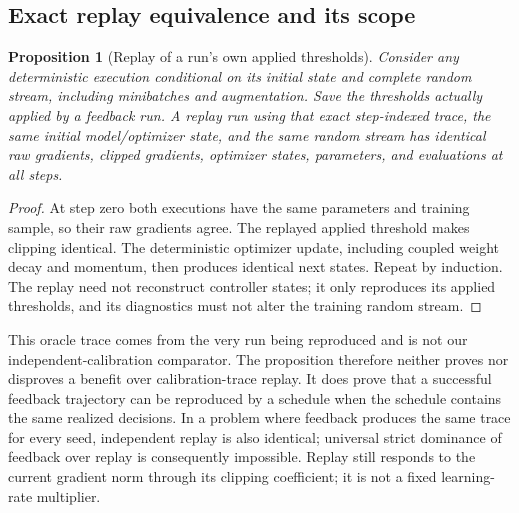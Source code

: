 \documentclass{article}
\newtheorem{proposition}{Proposition}
\begin{document}
\subsection{Exact replay equivalence and its scope}
\begin{proposition}[Replay of a run's own applied thresholds]
Consider any deterministic execution conditional on its initial state and
complete random stream, including minibatches and augmentation. Save the
thresholds actually applied by a feedback run. A replay run using that exact
step-indexed trace, the same initial model/optimizer state, and the same random
stream has identical raw gradients, clipped gradients, optimizer states,
parameters, and evaluations at all steps.
\end{proposition}
\begin{proof}
At step zero both executions have the same parameters and training sample,
so their raw gradients agree. The replayed applied threshold makes clipping
identical. The deterministic optimizer update, including coupled weight decay
and momentum, then produces identical next states. Repeat by induction. The
replay need not reconstruct controller states; it only reproduces its applied
thresholds, and its diagnostics must not alter the training random stream.
\end{proof}
This oracle trace comes from the very run being reproduced and is not our
independent-calibration comparator. The proposition therefore neither proves
nor disproves a benefit over calibration-trace replay. It does prove that a
successful feedback trajectory can be reproduced by a schedule when the
schedule contains the same realized decisions. In a problem where feedback
produces the same trace for every seed, independent replay is also identical;
universal strict dominance of feedback over replay is consequently impossible.
Replay still responds to the current gradient norm through its clipping
coefficient; it is not a fixed learning-rate multiplier.
\end{document}
